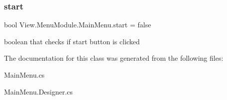 \subsubsection{\texorpdfstring{start}{start}}
{\footnotesize\ttfamily bool View.\+Menu\+Module.\+Main\+Menu.\+start = false}

boolean that checks if start button is clicked 

The documentation for this class was generated from the following files\+:\begin{DoxyCompactItemize}
\item 
Main\+Menu.\+cs\item 
Main\+Menu.\+Designer.\+cs\end{DoxyCompactItemize}
